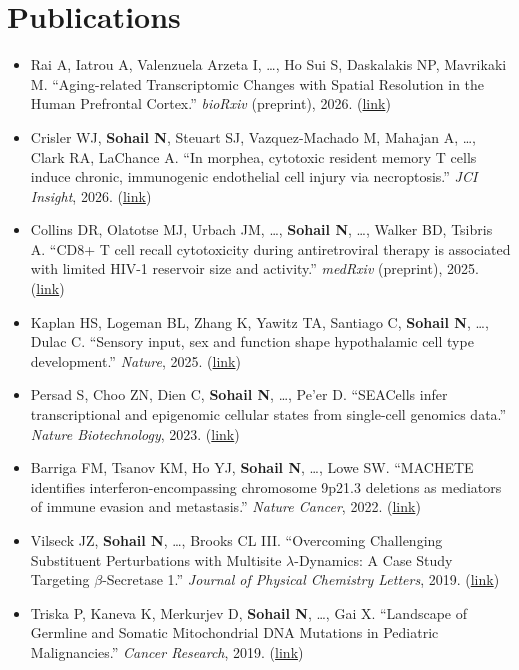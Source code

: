 \documentclass[letterpaper,10pt]{article}
\newcommand{\pubListStart}{\begin{itemize}[leftmargin=0.32in, labelsep=0.08in, align=left, itemsep=2.5pt, topsep=2pt]\interlinepenalty=10000}
\newcommand{\pubListEnd}{\end{itemize}}
\newcommand{\pub}[1]{\item[\small\color{meta-grey}{[#1]}]\small}
\newcommand{\myuline}[1]{#1}
\newcommand{\me}{\textcolor{accent}{\textbf{Sohail N}}}
\begin{document}
\section{Publications}
  \pubListStart
    \pub{1}
      Rai A, Iatrou A, Valenzuela Arzeta I, \dots, Ho Sui S, Daskalakis NP, Mavrikaki M. ``Aging-related Transcriptomic Changes with Spatial Resolution in the Human Prefrontal Cortex.'' \textit{bioRxiv} (preprint), 2026. (\href{https://www.biorxiv.org/content/10.64898/2026.01.12.698703v1}{\myuline{link}})
    \pub{2}
      Crisler WJ, \me, Steuart SJ, Vazquez-Machado M, Mahajan A, \dots, Clark RA, LaChance A. ``In morphea, cytotoxic resident memory T cells induce chronic, immunogenic endothelial cell injury via necroptosis.'' \textit{JCI Insight}, 2026. (\href{https://insight.jci.org/articles/view/201949}{\myuline{link}})
    \pub{3}
      Collins DR, Olatotse MJ, Urbach JM, \dots, \me, \dots, Walker BD, Tsibris A. ``CD8+ T cell recall cytotoxicity during antiretroviral therapy is associated with limited HIV-1 reservoir size and activity.'' \textit{medRxiv} (preprint), 2025. (\href{https://www.medrxiv.org/content/10.1101/2025.10.10.25337688v2}{\myuline{link}})
    \pub{4}
      Kaplan HS, Logeman BL, Zhang K, Yawitz TA, Santiago C, \me, \dots, Dulac C. ``Sensory input, sex and function shape hypothalamic cell type development.'' \textit{Nature}, 2025. (\href{https://www.nature.com/articles/s41586-025-08603-0}{\myuline{link}})
    \pub{5}
      Persad S, Choo ZN, Dien C, \me, \dots, Pe'er D. ``SEACells infer transcriptional and epigenomic cellular states from single-cell genomics data.'' \textit{Nature Biotechnology}, 2023. (\href{https://www.nature.com/articles/s41587-023-01716-9}{\myuline{link}})
    \pub{6}
      Barriga FM, Tsanov KM, Ho YJ, \me, \dots, Lowe SW. ``MACHETE identifies interferon-encompassing chromosome 9p21.3 deletions as mediators of immune evasion and metastasis.'' \textit{Nature Cancer}, 2022. (\href{https://www.nature.com/articles/s43018-022-00443-5}{\myuline{link}})
    \pub{7}
      Vilseck JZ, \me, \dots, Brooks CL III. ``Overcoming Challenging Substituent Perturbations with Multisite $\lambda$-Dynamics: A Case Study Targeting $\beta$-Secretase 1.'' \textit{Journal of Physical Chemistry Letters}, 2019. (\href{https://pubs.acs.org/doi/10.1021/acs.jpclett.9b02004}{\myuline{link}})
    \pub{8}
      Triska P, Kaneva K, Merkurjev D, \me, \dots, Gai X. ``Landscape of Germline and Somatic Mitochondrial DNA Mutations in Pediatric Malignancies.'' \textit{Cancer Research}, 2019. (\href{https://doi.org/10.1158/0008-5472.CAN-18-2220}{\myuline{link}})
  \pubListEnd
\end{document}
